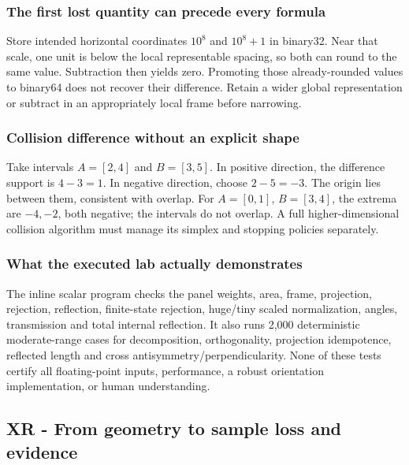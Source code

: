 \subsubsection{The first lost quantity can precede every formula}\label{appendix-92ff77d4dfdc-the-first-lost-quantity-can-precede-every-formula}

Store intended horizontal coordinates \(10^8\) and \(10^8+1\) in binary32. Near that scale, one unit is below the local representable spacing, so both can round to the same value. Subtraction then yields zero. Promoting those already-rounded values to binary64 does not recover their difference. Retain a wider global representation or subtract in an appropriately local frame before narrowing.

\subsubsection{Collision difference without an explicit shape}\label{appendix-92ff77d4dfdc-collision-difference-without-an-explicit-shape}

Take intervals \(A=[2,4]\) and \(B=[3,5]\). In positive direction, the difference support is \(4-3=1\). In negative direction, choose \(2-5=-3\). The origin lies between them, consistent with overlap. For \(A=[0,1]\), \(B=[3,4]\), the extrema are \(-4,-2\), both negative; the intervals do not overlap. A full higher-dimensional collision algorithm must manage its simplex and stopping policies separately.

\subsubsection{What the executed lab actually demonstrates}\label{appendix-92ff77d4dfdc-what-the-executed-lab-actually-demonstrates}

The inline scalar program checks the panel weights, area, frame, projection, rejection, reflection, finite-state rejection, huge/tiny scaled normalization, angles, transmission and total internal reflection. It also runs 2,000 deterministic moderate-range cases for decomposition, orthogonality, projection idempotence, reflected length and cross antisymmetry/perpendicularity. None of these tests certify all floating-point inputs, performance, a robust orientation implementation, or human understanding.

\subsection{XR - From geometry to sample loss and evidence}\label{appendix-92ff77d4dfdc-xr---from-geometry-to-sample-loss-and-evidence}

